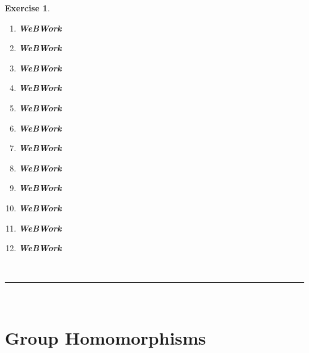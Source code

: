 \documentclass[a4paper,12pt]{report}
\newcounter{statement}
\numberwithin{statement}{chapter}
\newtheorem{ex}[statement]{\bf Exercise}
\numberwithin{equation}{chapter}
\numberwithin{section}{chapter}
\numberwithin{subsection}{section}
\begin{document}
\begin{ex}
\begin{enumerate}
\item 

{\bf WeBWork}

\item 

{\bf WeBWork}

\item 

{\bf WeBWork}

\item 

{\bf WeBWork}

\item 

{\bf WeBWork}

\item 

{\bf WeBWork}

\item 

{\bf WeBWork}

\item 

{\bf WeBWork}

\item 

{\bf WeBWork}

\item 

{\bf WeBWork}

\item 

{\bf WeBWork}

\item 

{\bf WeBWork}
\end{enumerate}
\end{ex}
\quad\\\hrule
\quad\\
\section*{Group Homomorphisms}
\end{document}
